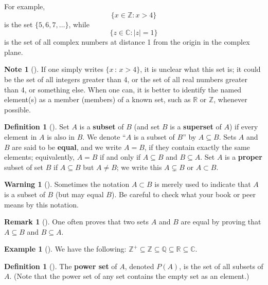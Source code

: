 \documentclass[10pt,]{book}
\newcommand{\terminology}[1]{\textbf{#1}}
\theoremstyle{plain}
\theoremstyle{definition}
\newtheorem{definition}[theorem]{Definition}
\theoremstyle{definition}
\newtheorem{remark}[theorem]{Remark}
\newtheorem{note}[theorem]{Note}
\newtheorem{warning}[theorem]{Warning}
\theoremstyle{definition}
\newtheorem{example}[theorem]{Example}
\theoremstyle{definition}
\numberwithin{equation}{section}
\def\Z{\mathbb{Z}}
\def\R{\mathbb{R}}
\def\Q{\mathbb{Q}}
\def\C{\mathbb{C}}
\begin{document}
 For example,%
\begin{equation*}
\{x\in \Z : x > 4\}
\end{equation*}
is the set \(\{5, 6, 7, \ldots\}\), while%
\begin{equation*}
\{z\in \C : |z|=1\}
\end{equation*}
is the set of all complex numbers at distance 1 from the origin in the complex plane.%
\begin{note}[]\label{note-2}
If one simply writes \(\{x\,:\,x>4\}\), it is unclear what this set is; it could be the set of all integers greater than 4, or the set of all real numbers greater than 4, or something else. When one can, it is better to identify the named element(s) as a member (members) of a known set, such as \(\R\) or \(\Z\), whenever possible.%
\end{note}
\begin{definition}[{}]\label{definition-3}
Set \(A\) is a \terminology{subset} of \(B\) (and set \(B\) is a \terminology{superset} of \(A\)) if every element in \(A\) is also in \(B\). We denote ``\(A\) is a subset of \(B\)'' by \(A\subseteq B\). Sets \(A\) and \(B\) are said to be \terminology{equal}, and we write \(A=B\), if they contain exactly the same elements; equivalently, \(A=B\) if and only if \(A \subseteq B\) and \(B\subseteq A\). Set \(A\) is a \terminology{proper} subset of set \(B\) if \(A\subseteq B\) but \(A\neq B\); we write this \(A\subsetneq B\) or \(A\subset B\).%
\begin{warning}[]\label{warning-2}
Sometimes the notation \(A\subset B\) is merely used to indicate that \(A\) is a subset of \(B\) (but may equal \(B\)). Be careful to check what your book or peer means by this notation.%
\end{warning}
\label{notation-14}
\label{notation-15}
\end{definition}
\begin{remark}[]\label{remark-1}
One often proves that two sets \(A\) and \(B\) are equal by proving that \(A\subseteq B\) and \(B\subseteq A\).%
\end{remark}
\begin{example}[]\label{example-2}
We have the following: \(\Z^+ \subseteq \Z \subseteq \Q \subseteq \R \subseteq \C\).%
\end{example}
\begin{definition}[{}]\label{definition-4}
The \terminology{power set} of \(A\), denoted \(P(A)\), is the set of all subsets of \(A\). (Note that the power set of any set contains the empty set as an element.)%
\label{notation-16}
\end{definition}
\end{document}
